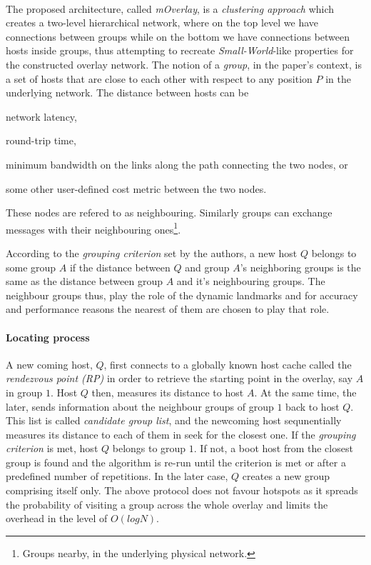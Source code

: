 \documentclass[a4paper,10pt]{article}
\begin{document}
\paragraph{}
The proposed architecture, called \emph{mOverlay}, is a \emph{clustering approach} which creates a two-level hierarchical network, where on the top level we have connections between groups while on the bottom we have connections between hosts inside groups, thus attempting to recreate \emph{Small-World}-like properties for the constructed overlay network. The notion of a \emph{group}, in the paper's context, is a set of hosts that are close to each other with respect to any position $P$ in the underlying network. The distance between hosts can be 
\begin{inparaenum}
  \item network latency,
  \item round-trip time,
  \item minimum bandwidth on the links along the path connecting the two nodes, or
  \item some other user-defined cost metric between the two nodes.
\end{inparaenum}
These nodes are refered to as neighbouring. Similarly groups can exchange messages with their neighbouring ones\footnote{Groups nearby, in the underlying physical network.}.

According to the \emph{grouping criterion} set by the authors, a new host $Q$ belongs to some group $A$ if the distance between $Q$ and group $A$'s neighboring groups is the same as the distance between group $A$ and it's neighbouring groups. The neighbour groups thus, play the role of the dynamic landmarks and for accuracy and performance reasons the nearest of them are chosen to play that role.

\paragraph{Locating process} A new coming host, $Q$, first connects to a globally known host cache called the \emph{rendezvous point (RP)} in order to retrieve the starting point in the overlay, say $A$ in group $1$. Host $Q$ then, measures its distance to host $A$. At the same time, the later, sends information about the neighbour groups of group $1$ back to host $Q$. This list is called \emph{candidate group list}, and the newcoming host sequnentially measures its distance to each of them in seek for the closest one. If the \emph{grouping criterion} is met, host $Q$ belongs to group $1$. If not, a boot host from the closest group is found and the algorithm is re-run until the criterion is met or after a predefined number of repetitions. In the later case, $Q$ creates a new group comprising itself only. The above protocol does not favour hotspots as it spreads the probability of visiting a group across the whole overlay and limits the overhead in the level of $O \left ( log N \right )$.
\end{document}
